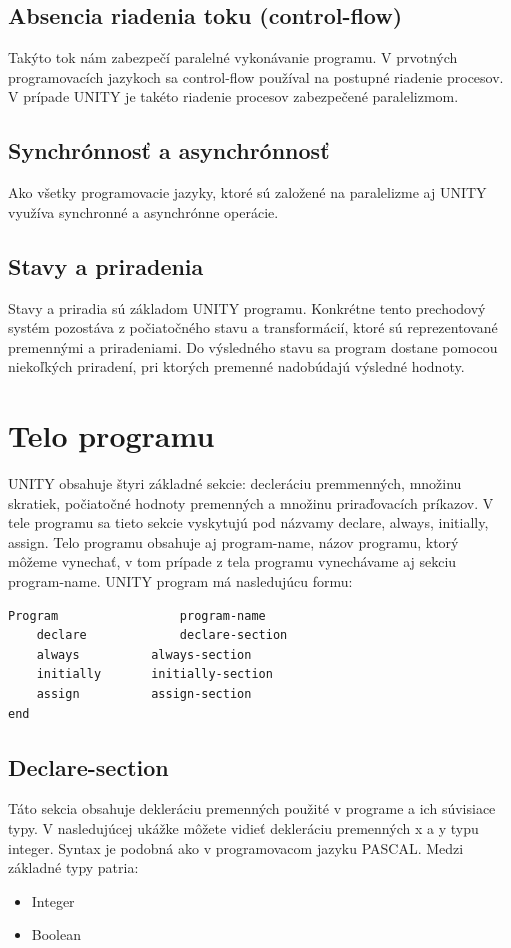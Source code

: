 \subsection{Absencia riadenia toku (control-flow)}
Takýto tok nám zabezpečí paralelné vykonávanie programu. V prvotných programovacích jazykoch sa control-flow používal
na postupné riadenie procesov. V prípade UNITY je takéto riadenie procesov zabezpečené paralelizmom.

\subsection{Synchrónnosť a asynchrónnosť}
Ako všetky programovacie jazyky, ktoré sú založené na paralelizme aj UNITY využíva synchronné a asynchrónne operácie. 

\subsection{Stavy a priradenia}
Stavy a priradia sú základom UNITY programu. Konkrétne tento prechodový systém pozostáva z počiatočného stavu a transformácií, 
ktoré sú reprezentované premennými a priradeniami. Do výsledného stavu sa program dostane pomocou niekoľkých priradení, pri ktorých 
premenné nadobúdajú výsledné hodnoty.

\section{Telo programu}

UNITY obsahuje štyri základné sekcie: decleráciu premmenných, množinu skratiek, 
počiatočné hodnoty premenných a množinu priraďovacích príkazov. 
V tele programu sa tieto sekcie vyskytujú pod názvamy declare, always, 
initially, assign. Telo programu obsahuje aj program-name, názov programu, 
ktorý môžeme vynechať, v tom prípade z tela programu vynechávame aj sekciu program-name. 
UNITY program má nasledujúcu formu:

\begin{lstlisting}
Program 				program-name
	declare 			declare-section
	always	 		always-section
	initially 		initially-section
	assign 			assign-section
end
\end{lstlisting}


\subsection{Declare-section}

Táto sekcia obsahuje dekleráciu premenných použité v programe a ich súvisiace typy. 
V nasledujúcej ukážke môžete vidieť dekleráciu premenných x a y typu integer. 
Syntax je podobná ako v programovacom jazyku PASCAL. Medzi základné typy patria:
\begin{itemize}
	\item Integer
	\item Boolean
\end{itemize}

